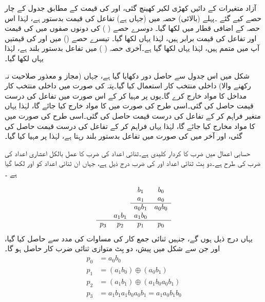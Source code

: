  آزاد متغیرات   کے دائیں  کھڑی  لکیر کھینچ گئی، اور      کی قیمت کے مطابق جدول کے چار حصے کیے گئے ۔پہلے (بالائی)  حصہ  میں (جہاں   ہے)   تفاعل   کی قیمت بدستور   ہے، لہٰذا اس   حصہ کے اضافی قطار  میں  لکھا   گیا۔ دوسرے حصے ( )   کی   دونوں  صفوں   میں   کی قیمت اور تفاعل  کی قیمت برابر ہیں،   لہٰذا  یہاں    لکھا گیا۔ تیسرے حصے  ()   میں  اور  کی قیمتیں آپ میں متمم ہیں، لہٰذا یہاں    لکھا گیا ہے۔آخری  حصہ ( )    میں تفاعل بدستور بلند ہے، لہٰذا یہاں    لکھا گیا۔


شکل    میں اس جدول سے حاصل دور دکھایا گیا ہے،  جہاں (مجاز و معذور صلاحیت نہ رکھنے والا)   داخلی منتخب کار استعمال کیا گیا۔پتہ  کی صورت میں داخلی منتخب کار مداخل     کا مواد    خارج   کرے  گا۔یوں   پر   مہیا کر کے اس صورت میں تفاعل کی درست قیمت حاصل  کی گئی۔اسی طرح  کی صورت میں   کا مواد  خارج کیا جائے گا، لہٰذا  یہاں متغیر  فراہم کر کے تفاعل کی درست قیمت حاصل کی   گئی۔اسی طرح    کی  صورت میں   کا مواد  مخارج  کیا جائے گا، لہٰذا   یہاں   فراہم کر کے تفاعل کی درست قیمت حاصل  کی گئی، اور آخر  میں   کی صورت میں     تفاعل بدستور بلند رہتا ہے، لہٰذا  پر  مہیا کیا گیا۔


حسابی اعمال میں ضرب کا کردار کلیدی ہے۔ثنائی اعداد کی ضرب کا عمل بالکل اعشاری اعداد کی ضرب کی طرح ہے۔دو بِٹ  ثنائی اعداد  اور  کی ضرب درج ذیل ہے،  جہاں ان ثنائی اعداد کو    اور  لکھا گیا ہے ۔

\begin{align*}
\begin{array}{cccc}
&& b_1&b_0\\
&& a_1&a_0\\
\cline{3-4}
&& a_0b_1&a_0b_0\\
&a_1b_1&a_1b_0&\\
\cline{1-4}
p_3&p_2&p_1&p_0
\end{array}
\end{align*}
یہاں  درج ذیل ہوں گے، جنہیں   ثنائی جمع کار کی  مساوات  کی مدد سے حاصل کیا گیا،  اور جن سے  شکل  میں پیش،  دو بِٹ متوازی ثنائی ضرب کار  حاصل ہو گا۔
\begin{align*}
p_0&=a_0b_0\\
p_1&=(a_1b_0)\oplus(a_0b_1)\\
p_2&=(a_1b_1)\oplus(a_1b_0a_0b_1)\\
p_3&=a_1b_1a_1b_0a_0b_1=a_1a_0b_1b_0
\end{align*}


